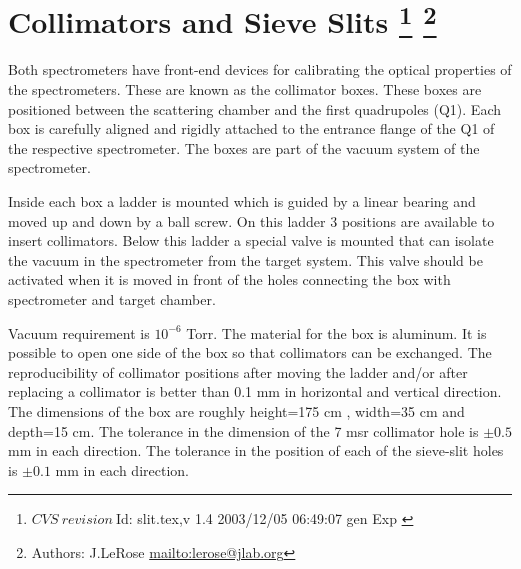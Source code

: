 \section[Collimators and Sieve Slits]{Collimators and Sieve Slits
\footnote{
  $CVS~revision~ $Id: slit.tex,v 1.4 2003/12/05 06:49:07 gen Exp $ $ 
}
\footnote{Authors: J.LeRose \url{mailto:lerose@jlab.org}}
}

Both spectrometers have front-end devices for calibrating the optical
properties of the spectrometers. These are known as the collimator boxes.
These boxes are positioned between the scattering chamber and the 
first quadrupoles (Q1). Each box is carefully aligned and rigidly attached
to the  entrance flange of the Q1 of the respective spectrometer.  The boxes are
part of the vacuum system of the spectrometer.


Inside each box a ladder is mounted which is guided by a linear bearing
and moved up and down by a ball screw. On this ladder 3 positions are 
available to insert collimators. Below this ladder
a special valve is mounted that can isolate the vacuum in the spectrometer
from the target system. This valve should be activated when it is moved
in front of the holes connecting the box with spectrometer and target chamber.

Vacuum requirement is $10^{-6}$ Torr. The material for the box is 
aluminum. It is possible to open one side of the box so that
collimators can be exchanged. The
reproducibility of collimator positions after moving
the ladder and/or after replacing a collimator is
better than 0.1 mm in horizontal and vertical direction.
The dimensions of the box are
roughly height=175 cm , width=35 cm and depth=15 cm.
The tolerance in the dimension
of the 7 msr collimator hole is $\pm0.5$ mm in each direction. 
The tolerance in the position
of each of the sieve-slit holes is $\pm0.1$ mm in each direction.

